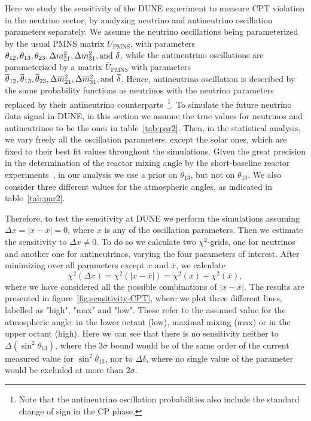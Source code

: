 Here we study the sensitivity of the DUNE experiment to measure CPT violation in the neutrino sector, by analyzing neutrino and antineutrino oscillation parameters separately. We assume the neutrino oscillations being parameterized by the usual PMNS matrix $U_{\text{PMNS}}$, with parameters $\theta_{12},\theta_{13},\theta_{23},\Delta m_{21}^2,\Delta m_{31}^2, {\rm and}~\delta$, while the antineutrino oscillations are parameterized by a matrix $\overline{U}_{\text{PMNS}}$ with parameters $\overline{\theta}_{12},\overline{\theta}_{13},\overline{\theta}_{23},\Delta \overline{m}_{21}^2,\Delta \overline{m}_{31}^2, {\rm and}~\overline{\delta}$. Hence, antineutrino oscillation is described  by the same probability functions as neutrinos with the neutrino parameters replaced by their antineutrino counterparts~\footnote{Note that the antineutrino oscillation probabilities also include the standard change of sign in the CP phase.}. 
To simulate the future neutrino data signal in DUNE, in this section we assume the true values for neutrinos and antineutrinos to be the ones in table~\ref{tab:par2}.
Then, in the statistical analysis, we vary freely all the oscillation parameters, except the solar ones, which are fixed to their best fit values throughout the simulations. Given the great precision in the determination of the reactor mixing angle by the short-baseline reactor experiments~\cite{An:2016ses,RENO:2015ksa,Abe:2014bwa}, in our analysis we use a prior on $\overline{\theta}_{13}$, but not on $\theta_{13}$. We also consider three different values for the atmospheric angles, as indicated in table~\ref{tab:par2}. 

Therefore, to test the sensitivity at DUNE we perform the simulations assuming $\Delta x = |x-\overline{x}| = 0$, where $x$ is any of the oscillation parameters. Then we estimate the sensitivity to $\Delta x\neq 0$. To do so we calculate two $\chi^2$-grids, one for neutrinos and another one for antineutrinos, varying the four parameters of interest. After minimizing over all parameters except $x$ and $\overline{x}$, we calculate 
%
\begin{equation}
 \chi^2(\Delta x) = \chi^2(|x-\overline{x}|) = \chi^2(x)+\chi^2(\overline{x}),
 \label{eq:chi2-nu-nubar}
\end{equation}
%
where we have considered all the possible combinations of $|x-\overline{x}|$. The results are presented in figure~\ref{fig:sensitivity-CPT}, where we plot three different lines, labelled as "high", "max" and "low". These refer to the assumed value for the atmospheric angle: in the lower octant (low), maximal mixing (max) or in the upper octant (high). Here we can see that there is no sensitivity neither to $\Delta(\sin^2\theta_{13})$, where the 3$\sigma$ bound would be of the same order of the current measured value for $\sin^2\overline{\theta}_{13}$, nor to $\Delta\delta$, where no single value of the parameter would be excluded at more than 2$\sigma$.

